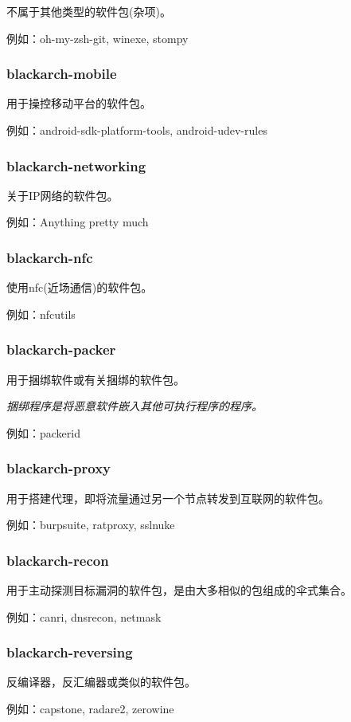 \documentclass[a4paper, oneside, 11pt]{book}
\begin{document}
不属于其他类型的软件包(杂项)。

例如：oh-my-zsh-git, winexe, stompy

\subsubsection{blackarch-mobile}
用于操控移动平台的软件包。

例如：android-sdk-platform-tools, android-udev-rules

\subsubsection{blackarch-networking}
关于IP网络的软件包。

例如：Anything pretty much

\subsubsection{blackarch-nfc}
使用nfc(近场通信)的软件包。

例如：nfcutils

\subsubsection{blackarch-packer}
用于捆绑软件或有关捆绑的软件包。

\textit{捆绑程序是将恶意软件嵌入其他可执行程序的程序。}

例如：packerid

\subsubsection{blackarch-proxy}
用于搭建代理，即将流量通过另一个节点转发到互联网的软件包。

例如：burpsuite, ratproxy, sslnuke

\subsubsection{blackarch-recon}
用于主动探测目标漏洞的软件包，是由大多相似的包组成的伞式集合。

例如：canri, dnsrecon, netmask

\subsubsection{blackarch-reversing}
反编译器，反汇编器或类似的软件包。

例如：capstone, radare2, zerowine
\end{document}

